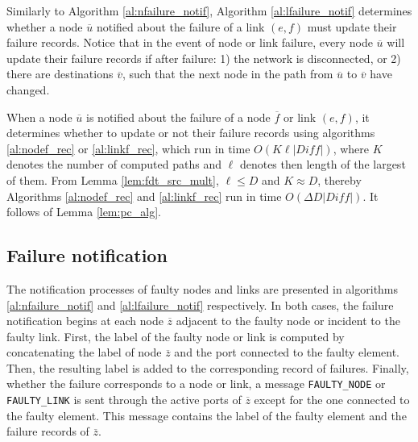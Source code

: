 

Similarly to Algorithm \ref{al:nfailure_notif}, Algorithm \ref{al:lfailure_notif} determines whether a node $\overline{u}$ notified about the failure of a link $(e, f)$ must update their failure records. Notice that in the event of node or link failure, every node $\overline{u}$ will update their failure records if after failure: 1) the network is disconnected, or 2) there are destinations $\overline{v}$, such that the next node in the path from $\overline{u}$ to $\overline{v}$ have changed.

\begin{lemma}
\label{lem:update_nf}
When a node $\overline{u}$ is notified about the failure of a node $\overline{f}$ or link $(e,f)$, it determines whether to update or not their failure records using algorithms \ref{al:nodef_rec} or \ref{al:linkf_rec}, which run in time $O(K\ell|Diff|)$, where $K$ denotes the number of computed paths and $\ell$ denotes then length of the largest of them. From Lemma \ref{lem:fdt_src_mult}, $\ell\leq D$ and $K\approx D$, thereby Algorithms \ref{al:nodef_rec} and \ref{al:linkf_rec} run in time $O(\Delta D|Diff|)$.  It follows of Lemma \ref{lem:pc_alg}.
\end{lemma}

\subsection{Failure notification}
\label{sec:failure_not}

The notification processes of faulty nodes and links are presented in algorithms \ref{al:nfailure_notif} and  \ref{al:lfailure_notif} respectively. In both cases, the failure notification begins at each node $\overline{z}$ adjacent to the faulty node or incident to the faulty link. First, the label of the faulty node or link is computed by concatenating the label of node $\overline{z}$ and the port connected to the faulty element. Then, the resulting label is added to the corresponding record of failures. Finally, whether the failure corresponds to a node or link, a message \texttt{FAULTY\_NODE} or \texttt{FAULTY\_LINK} is sent through the active ports of $\overline{z}$ except for the one connected to the faulty element.
This message contains the label of the faulty element and the failure records of $\overline{z}$.





